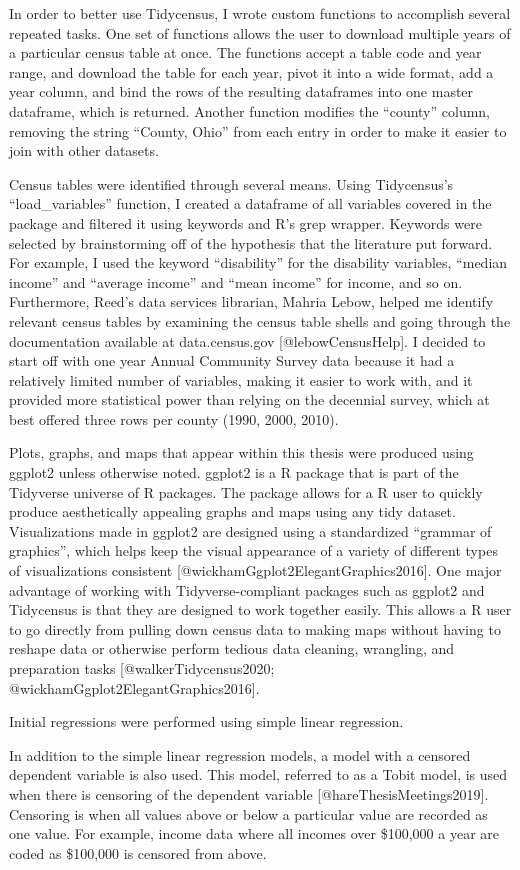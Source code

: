 \documentclass[
]{article}
\begin{document}
In order to better use Tidycensus, I wrote custom functions to
accomplish several repeated tasks. One set of functions allows the user
to download multiple years of a particular census table at once. The
functions accept a table code and year range, and download the table for
each year, pivot it into a wide format, add a year column, and bind the
rows of the resulting dataframes into one master dataframe, which is
returned. Another function modifies the ``county'' column, removing the
string ``County, Ohio'' from each entry in order to make it easier to
join with other datasets.

Census tables were identified through several means. Using Tidycensus's
``load\_variables'' function, I created a dataframe of all variables
covered in the package and filtered it using keywords and R's grep
wrapper. Keywords were selected by brainstorming off of the hypothesis
that the literature put forward. For example, I used the keyword
``disability'' for the disability variables, ``median income'' and
``average income'' and ``mean income'' for income, and so on.
Furthermore, Reed's data services librarian, Mahria Lebow, helped me
identify relevant census tables by examining the census table shells and
going through the documentation available at data.census.gov
{[}@lebowCensusHelp{]}. I decided to start off with one year Annual
Community Survey data because it had a relatively limited number of
variables, making it easier to work with, and it provided more
statistical power than relying on the decennial survey, which at best
offered three rows per county (1990, 2000, 2010).

Plots, graphs, and maps that appear within this thesis were produced
using ggplot2 unless otherwise noted. ggplot2 is a R package that is
part of the Tidyverse universe of R packages. The package allows for a R
user to quickly produce aesthetically appealing graphs and maps using
any tidy dataset. Visualizations made in ggplot2 are designed using a
standardized ``grammar of graphics'', which helps keep the visual
appearance of a variety of different types of visualizations consistent
{[}@wickhamGgplot2ElegantGraphics2016{]}. One major advantage of working
with Tidyverse-compliant packages such as ggplot2 and Tidycensus is that
they are designed to work together easily. This allows a R user to go
directly from pulling down census data to making maps without having to
reshape data or otherwise perform tedious data cleaning, wrangling, and
preparation tasks {[}@walkerTidycensus2020;
@wickhamGgplot2ElegantGraphics2016{]}.

Initial regressions were performed using simple linear regression.

In addition to the simple linear regression models, a model with a
censored dependent variable is also used. This model, referred to as a
Tobit model, is used when there is censoring of the dependent variable
{[}@hareThesisMeetings2019{]}. Censoring is when all values above or
below a particular value are recorded as one value. For example, income
data where all incomes over \$100,000 a year are coded as \$100,000 is
censored from above.
\end{document}
